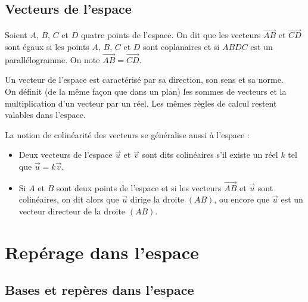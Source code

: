 \documentclass[10pt]{article}
\begin{document}
\subsection{Vecteurs de l'espace}

Soient $A$, $B$, $C$ et $D$ quatre points de l'espace. On dit que les vecteurs $\Vec{AB}$ et $\Vec{CD}$ sont égaux si
les points $A$, $B$, $C$ et $D$ sont coplanaires et si $ABDC$ est un parallélogramme. On note $\Vec{AB}=\Vec{CD}$.\newline

Un vecteur de l'espace est caractérisé par sa direction, son sens et sa norme.\\
On définit (de la même façon que dans un plan) les sommes de vecteurs et la multiplication d'un vecteur par un réel. Les
mêmes règles de calcul restent valables dans l'espace.

La notion de colinéarité des vecteurs se généralise aussi à l'espace :
\begin{itemize}
    \item Deux vecteurs de l'espace $\vec{u}$ et $\vec{v}$ sont dits colinéaires s'il existe un réel $k$ tel que
          $\vec{u}=k\vec{v}$.
    \item Si $A$ et $B$ sont deux points de l'espace et si les vecteurs $\Vec{AB}$ et $\vec{u}$ sont colinéaires, on dit alors que
          $\vec{u}$ dirige la droite $(AB)$, ou encore que $\vec{u}$ est un vecteur directeur de la droite $(AB)$.
\end{itemize}


\section{Repérage dans l'espace}

\subsection{Bases et repères dans l'espace}
\end{document}
